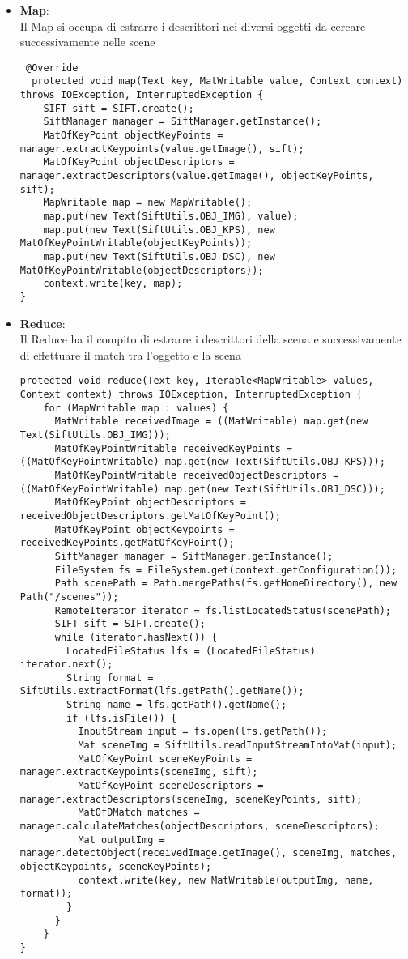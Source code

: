 \begin{itemize}

\item \textbf{Map}:\\
Il Map si occupa di estrarre i descrittori nei diversi oggetti da cercare successivamente nelle scene
\begin{lstlisting}
 @Override
  protected void map(Text key, MatWritable value, Context context) throws IOException, InterruptedException {
    SIFT sift = SIFT.create();
    SiftManager manager = SiftManager.getInstance();
    MatOfKeyPoint objectKeyPoints = manager.extractKeypoints(value.getImage(), sift);
    MatOfKeyPoint objectDescriptors = manager.extractDescriptors(value.getImage(), objectKeyPoints, sift);
    MapWritable map = new MapWritable();
    map.put(new Text(SiftUtils.OBJ_IMG), value);
    map.put(new Text(SiftUtils.OBJ_KPS), new MatOfKeyPointWritable(objectKeyPoints));
    map.put(new Text(SiftUtils.OBJ_DSC), new MatOfKeyPointWritable(objectDescriptors));
    context.write(key, map);
}
\end{lstlisting}

\item \textbf{Reduce}: \\
Il Reduce ha il compito di estrarre i descrittori della scena e successivamente di effettuare il match tra l'oggetto e la scena 
\begin{lstlisting}
protected void reduce(Text key, Iterable<MapWritable> values, Context context) throws IOException, InterruptedException {
    for (MapWritable map : values) {
      MatWritable receivedImage = ((MatWritable) map.get(new Text(SiftUtils.OBJ_IMG)));
      MatOfKeyPointWritable receivedKeyPoints = ((MatOfKeyPointWritable) map.get(new Text(SiftUtils.OBJ_KPS)));
      MatOfKeyPointWritable receivedObjectDescriptors = ((MatOfKeyPointWritable) map.get(new Text(SiftUtils.OBJ_DSC)));
      MatOfKeyPoint objectDescriptors = receivedObjectDescriptors.getMatOfKeyPoint();
      MatOfKeyPoint objectKeypoints = receivedKeyPoints.getMatOfKeyPoint();
      SiftManager manager = SiftManager.getInstance();
      FileSystem fs = FileSystem.get(context.getConfiguration());
      Path scenePath = Path.mergePaths(fs.getHomeDirectory(), new Path("/scenes"));
      RemoteIterator iterator = fs.listLocatedStatus(scenePath);
      SIFT sift = SIFT.create();
      while (iterator.hasNext()) {
        LocatedFileStatus lfs = (LocatedFileStatus) iterator.next();
        String format = SiftUtils.extractFormat(lfs.getPath().getName());
        String name = lfs.getPath().getName();
        if (lfs.isFile()) {
          InputStream input = fs.open(lfs.getPath());
          Mat sceneImg = SiftUtils.readInputStreamIntoMat(input);
          MatOfKeyPoint sceneKeyPoints = manager.extractKeypoints(sceneImg, sift);
          MatOfKeyPoint sceneDescriptors = manager.extractDescriptors(sceneImg, sceneKeyPoints, sift);
          MatOfDMatch matches = manager.calculateMatches(objectDescriptors, sceneDescriptors);
          Mat outputImg = manager.detectObject(receivedImage.getImage(), sceneImg, matches, objectKeypoints, sceneKeyPoints);
          context.write(key, new MatWritable(outputImg, name, format));
        }
      }
    }
}
\end{lstlisting}


\end{itemize}
